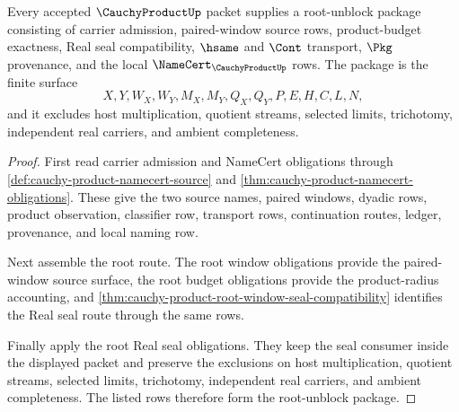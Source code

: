 \begin{theorem}
\label{thm:cauchy-product-root-obligation-package}
Every accepted $\CauchyProductUp$ packet supplies a root-unblock package consisting of carrier admission, paired-window source rows, product-budget exactness, Real seal compatibility, $\hsame$ and $\Cont$ transport, $\Pkg$ provenance, and the local $\NameCert_{\CauchyProductUp}$ rows. The package is the finite surface
$$
X,Y,W_X,W_Y,M_X,M_Y,Q_X,Q_Y,P,E,H,C,L,N,
$$
and it excludes host multiplication, quotient streams, selected limits, trichotomy, independent real carriers, and ambient completeness.
\end{theorem}
\begin{proof}
First read carrier admission and NameCert obligations through \autoref{def:cauchy-product-namecert-source} and \autoref{thm:cauchy-product-namecert-obligations}. These give the two source names, paired windows, dyadic rows, product observation, classifier row, transport rows, continuation routes, ledger, provenance, and local naming row.

Next assemble the root route. The root window obligations provide the paired-window source surface, the root budget obligations provide the product-radius accounting, and \autoref{thm:cauchy-product-root-window-seal-compatibility} identifies the Real seal route through the same rows.

Finally apply the root Real seal obligations. They keep the seal consumer inside the displayed packet and preserve the exclusions on host multiplication, quotient streams, selected limits, trichotomy, independent real carriers, and ambient completeness. The listed rows therefore form the root-unblock package.
\end{proof}

